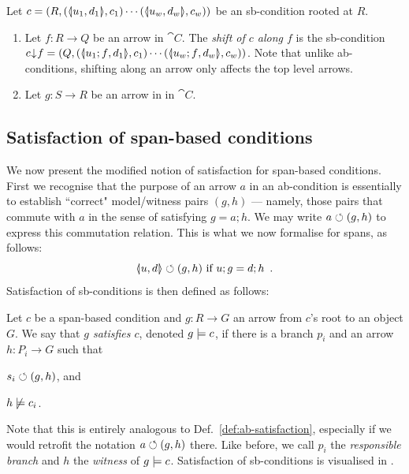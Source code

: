 \begin{definition}
  \label{def:sb-shift}
Let $c = (R,(\spanof {u_1} {d_1},{c_1})\cdots(\spanof {u_w} {d_w},{c_w}))$ be an sb-condition rooted at $R$. 
\begin{enumerate}
\item Let $f: R \to Q$ be an arrow in $\cat{C}$. The \emph{shift of $c$ along $f$} is the sb-condition $\shift{c}{f} = (Q,(\spanof {u_1;f} {d_1},{c_1})\cdots(\spanof {u_w;f} {d_w},{c_w}))$. Note that unlike ab-conditions, shifting along an arrow only affects  the top level arrows. 
\item Let $g: S \to R$ be an arrow in in $\cat{C}$. 
\end{enumerate}
\end{definition}



\subsection{Satisfaction of span-based conditions}

We now present the modified notion of satisfaction for span-based conditions. First we recognise that the purpose of an arrow $a$ in an ab-condition is essentially to establish ``correct" model/witness pairs $(g,h)$ --- namely, those pairs that commute with $a$ in the sense of satisfying $g=a;h$. We may write $a\circlearrowleft (g,h)$ to express this commutation relation. This is what we now formalise for spans, as follows:
\[ \spanof u d \commutes (g,h) \text{ if } u;g=d;h \enspace. \]
Satisfaction of sb-conditions is then defined as follows:

\begin{definition}\label{def:sb-satisfaction}
  Let $c$ be a span-based condition and $g:R\to G$ an arrow from $c$'s root to an object $G$. We say that \emph{$g$ satisfies $c$}, denoted $g\models c$, if there is a branch $p_i$ and an arrow $h:P_i\to G$ such that
  \begin{enumerate*}
  \item $s_i \circlearrowleft (g, h)$, and
  \item $h\not\models c_i$.
  \end{enumerate*}
\end{definition}
%
Note that this is entirely analogous to Def.~\ref{def:ab-satisfaction}, especially if we would retrofit the notation $a\circlearrowleft (g,h)$ there. Like before, we call $p_i$ the \emph{responsible branch} and $h$ the \emph{witness} of $g\models c$. Satisfaction of sb-conditions is visualised in .


